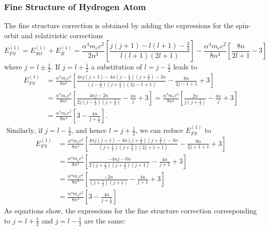 \subsubsection{Fine Structure of Hydrogen Atom}
The fine structure correction is obtained by adding the expressions for the spin-orbit and relativistic corrections
$$
E_{F S}^{(1)}=E_{S O}^{(1)}+E_{R}^{(1)}=\frac{\alpha^{4} m_{e} c^{2}}{2 n^{3}}\left[\frac{j(j+1)-l(l+1)-\frac{3}{4}}{l(l+1)(2 l+1)}\right]-\frac{\alpha^{4} m_{e} c^{2}}{8 n^{4}}\left[\frac{8 n}{2 l+1}-3\right]
$$
where $j=l \pm \frac{1}{2} .$ If $j=l+\frac{1}{2}$ a substitution of $l=j-\frac{1}{2}$  leads to
$$\begin{aligned}
	E_{F S}^{(1)} &=\frac{\alpha^{4} m_{e} c^{2}}{8 n^{4}}\left[\frac{4 n j(j+1)-4 n\left(j-\frac{1}{2}\right)\left(j+\frac{1}{2}\right)-3 n}{\left(j-\frac{1}{2}\right)\left(j+\frac{1}{2}\right)(2 j-1+1)}-\frac{8 n}{2 j-1+1}+3\right] \\
	&=\frac{\alpha^{4} m_{e} c^{2}}{8 n^{4}}\left[\frac{4 n j-2 n}{2 j\left(j-\frac{1}{2}\right)\left(j+\frac{1}{2}\right)}-\frac{4 n}{j}+3\right]=\frac{\alpha^{4} m_{e} c^{2}}{8 n^{4}}\left[\frac{2 n}{j\left(j+\frac{1}{2}\right)}-\frac{4 n}{j}+3\right] \\
	&=\frac{\alpha^{4} m_{e} c^{2}}{8 n^{4}}\left[3-\frac{4 n}{j+\frac{1}{2}}\right] .
\end{aligned}$$
$\text { Similarly, if } j=l-\frac{1}{2} \text {, and hence } l=j+\frac{1}{2} \text {, we can reduce } E_{F S}^{(1)}$ to\\
$$\begin{aligned}
	E_{F S}^{(1)} &=\frac{\alpha^{4} m_{e} c^{2}}{8 n^{4}}\left[\frac{4 n j(j+1)-4 n\left(j+\frac{1}{2}\right)\left(j+\frac{3}{2}\right)-3 n}{\left(j+\frac{1}{2}\right)\left(j+\frac{3}{2}\right)(2 j+1+1)}-\frac{8 n}{2 j+1+1}+3\right] \\
	&=\frac{\alpha^{4} m_{e} c^{2}}{8 n^{4}}\left[\frac{-4 n j-6 n}{2\left(j+\frac{1}{2}\right)\left(j+\frac{3}{2}\right)(j+1)}-\frac{4 n}{j+1}+3\right] \\
	&=\frac{\alpha^{4} m_{e} c^{2}}{8 n^{4}}\left[\frac{-2 n}{\left(j+\frac{1}{2}\right)(j+1)}-\frac{4 n}{j+1}+3\right] \\
	&=\frac{\alpha^{4} m_{e} c^{2}}{8 n^{4}}\left[3-\frac{4 n}{j+\frac{1}{2}}\right]
\end{aligned}$$
As equations show, the expressions for the fine structure correction corresponding to $j=l+\frac{1}{2}$ and $j=l-\frac{1}{2}$ are the same:

